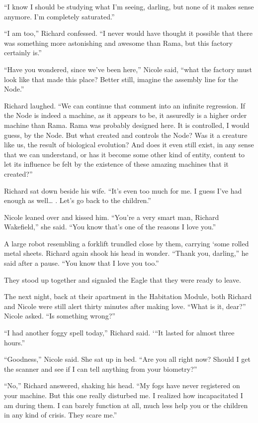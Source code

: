 \documentclass[]{article}
\begin{document}
{“I know I should be studying what I’m seeing, darling, but none of it makes sense anymore.  I’m completely saturated.”

“I am too,” Richard confessed.  “I never would have thought it possible that there was something more astonishing and awesome than Rama, but this factory certainly is.”

“Have you wondered, since we’ve been here,” Nicole said, “what the factory must look like that made this place? Better still, imagine the assembly line for the Node.”

Richard laughed.  “We can continue that comment into an infinite regression.  If the Node is indeed a machine, as it appears to be, it assuredly is a higher order machine than Rama.  Rama was probably designed here.  It is controlled, I would guess, by the Node.  But what created and controls the Node? Was it a creature like us, the result of biological evolution? And does it even still exist, in any sense that we can understand, or has it become some other kind of entity, content to let its influence be felt by the existence of these amazing machines that it created?”

Richard sat down beside his wife.  “It’s even too much for me.  I guess I’ve had enough as well… .  Let’s go back to the children.”

Nicole leaned over and kissed him.  “You’re a very smart man, Richard Wakefield,” she said.  “You know that’s one of the reasons I love you.”

A large robot resembling a forklift trundled close by them, carrying ‘some rolled metal sheets.  Richard again shook his head in wonder.  “Thank you, darling,” he said after a pause.  “You know that I love you too.”

They stood up together and signaled the Eagle that they were ready to leave.

The next night, back at their apartment in the Habitation Module, both Richard and Nicole were still alert thirty minutes after making love.  “What is it, dear?” Nicole asked.  “Is something wrong?”

“I had another foggy spell today,” Richard said.  ‘“It lasted for almost three hours.”

“Goodness,” Nicole said.  She sat up in bed.  “Are you all right now? Should I get the scanner and see if I can tell anything from your biometry?”

“No,” Richard answered, shaking his head.  “My fogs have never registered on your machine.  But this one really disturbed me.  I realized how incapacitated I am during them.  I can barely function at all, much less help you or the children in any kind of crisis.  They scare me.”

}
\end{document}
